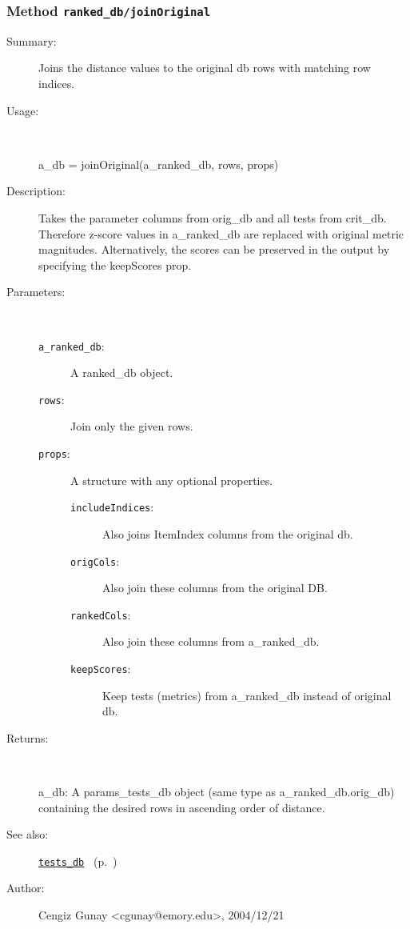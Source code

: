 \subsubsection[Method \texttt{joinOriginal}]{Method \texttt{ranked\_db/joinOriginal}}%
%
\label{ref_ranked_db__joinOriginal}%
\hypertarget{ref_ranked_db__joinOriginal}{}%
\begin{description}
\item[Summary:]Joins the distance values to the original db rows with matching row indices.
%
\item[Usage:]~%
\begin{lyxcode}%
a\_db = joinOriginal(a\_ranked\_db, rows, props)
%
\end{lyxcode}%
%
\item[Description:]%
Takes the parameter columns from orig\_db and all tests from
 crit\_db. Therefore z-score values in a\_ranked\_db are replaced with
 original metric magnitudes. Alternatively, the scores can be preserved in
 the output by specifying the keepScores prop.
\item[Parameters:]~
\begin{description}%
\item[\texttt{a\_ranked\_db}:]
 A ranked\_db object.
\item[\texttt{rows}:]
 Join only the given rows.
\item[\texttt{props}:]
 A structure with any optional properties.
\begin{description}%
\item[\texttt{includeIndices}:]
 Also joins ItemIndex columns from the original db.
\item[\texttt{origCols}:]
 Also join these columns from the original DB.
\item[\texttt{rankedCols}:]
 Also join these columns from a\_ranked\_db.
\item[\texttt{keepScores}:]
 Keep tests (metrics) from a\_ranked\_db instead of original db.
\end{description}%
\end{description}%
%
\item[Returns:
]~

   a\_db: A params\_tests\_db object (same type as a\_ranked\_db.orig\_db) containing 
	the desired rows in ascending order of distance.
%
%
\item[See also:]%
\hyperlink{ref_tests_db}{\texttt{tests\_db}}%
\ (p.~\pageref{ref_tests_db})%
%
%
\item[Author:]%
Cengiz Gunay <cgunay@emory.edu>, 2004/12/21
%
\end{description}
\methodline%
